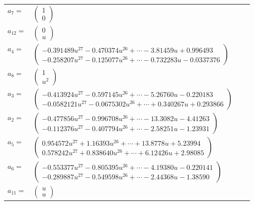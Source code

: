 \documentclass[1p]{elsarticle_modified}
\theoremstyle{definition}
\begin{document}
\begin{tabular}{m{7pt} m{180pt} m{7pt} m{180pt} }
\flushright $a_{7}=$&$\begin{pmatrix}1\\0\end{pmatrix}$ \\
\flushright $a_{12}=$&$\begin{pmatrix}0\\u\end{pmatrix}$ \\
\flushright $a_{4}=$&$\begin{pmatrix}-0.391489 u^{27}-0.470374 u^{26}+\cdots-3.81459 u+0.996493\\-0.258207 u^{27}-0.125077 u^{26}+\cdots-0.732283 u-0.0337376\end{pmatrix}$ \\
\flushright $a_{8}=$&$\begin{pmatrix}1\\u^2\end{pmatrix}$ \\
\flushright $a_{3}=$&$\begin{pmatrix}-0.413924 u^{27}-0.597145 u^{26}+\cdots-5.26760 u-0.220183\\-0.0582121 u^{27}-0.0675302 u^{26}+\cdots+0.340267 u+0.293866\end{pmatrix}$ \\
\flushright $a_{2}=$&$\begin{pmatrix}-0.477856 u^{27}-0.996708 u^{26}+\cdots-13.3082 u-4.41263\\-0.112376 u^{27}-0.407794 u^{26}+\cdots-2.58251 u-1.23931\end{pmatrix}$ \\
\flushright $a_{5}=$&$\begin{pmatrix}0.954572 u^{27}+1.16393 u^{26}+\cdots+13.8778 u+5.23994\\0.578242 u^{27}+0.838640 u^{26}+\cdots+6.12426 u+2.98085\end{pmatrix}$ \\
\flushright $a_{6}=$&$\begin{pmatrix}-0.553377 u^{27}-0.805395 u^{26}+\cdots-4.19380 u-0.220141\\-0.289887 u^{27}-0.549598 u^{26}+\cdots-2.44368 u-1.38590\end{pmatrix}$ \\
\flushright $a_{11}=$&$\begin{pmatrix}u\\u\end{pmatrix}$ \\

\end{tabular}
\end{document}

